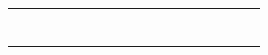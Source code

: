 \documentclass[a4paper,11pt]{report}
\begin{document}
\begin{center}
\begin{tabular}{|c|c|c|c|c|c|c|c|c|c|c|c||c|c|c|c|c|c|}
\hline
  &  &  &  &  &  &  &   &   &   &    &  &  &  &  &  &  &  \\
\hline
  &  &  &  &  &  &  &   &   &   &    &  &  &  &  &  &  &  \\
\hline
  &  &  &  &  &  &  &   &   &   &    &  &  &  &  &  &  &  \\
\hline
  &  &  &  &  &  &  &   &   &   &    &  &  &  &  &  &  &  \\
\hline
  &  &  &  &  &  &  &   &   &   &    &  &  &  &  &  &  &  \\
\hline
  &  &  &  &  &  &  &   &   &   &    &  &  &  &  &  &  &  \\
\hline
  &  &  &  &  &  &  &   &   &   &    &  &  &  &  &  &  &  \\
\hline
  &  &  &  &  &  &  &   &   &   &    &  &  &  &  &  &  &  \\
\hline


\end{tabular}
\end{center}
\end{document}
